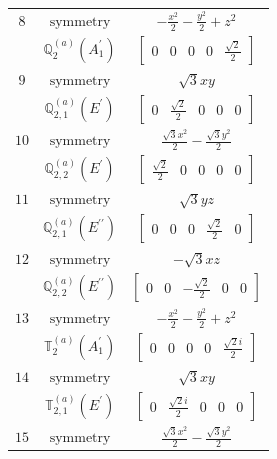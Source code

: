 \documentclass[fleqn,8pt,landscape]{jsarticle}
\begin{document}
\begin{longtable}{ccc}
$ 8 $ & $ \text{symmetry} $ & $ - \frac{x^{2}}{2} - \frac{y^{2}}{2} + z^{2} $ \\
$  $ & $ \mathbb{Q}_{2}^{(a)}(A_{1}^{\prime}) $ & $ \begin{bmatrix} 0 & 0 & 0 & 0 & \frac{\sqrt{2}}{2} \end{bmatrix} $ \\ \hline
$ 9 $ & $ \text{symmetry} $ & $ \sqrt{3} x y $ \\
$  $ & $ \mathbb{Q}_{2,1}^{(a)}(E^{\prime}) $ & $ \begin{bmatrix} 0 & \frac{\sqrt{2}}{2} & 0 & 0 & 0 \end{bmatrix} $ \\ \hline
$ 10 $ & $ \text{symmetry} $ & $ \frac{\sqrt{3} x^{2}}{2} - \frac{\sqrt{3} y^{2}}{2} $ \\
$  $ & $ \mathbb{Q}_{2,2}^{(a)}(E^{\prime}) $ & $ \begin{bmatrix} \frac{\sqrt{2}}{2} & 0 & 0 & 0 & 0 \end{bmatrix} $ \\ \hline
$ 11 $ & $ \text{symmetry} $ & $ \sqrt{3} y z $ \\
$  $ & $ \mathbb{Q}_{2,1}^{(a)}(E^{\prime\prime}) $ & $ \begin{bmatrix} 0 & 0 & 0 & \frac{\sqrt{2}}{2} & 0 \end{bmatrix} $ \\ \hline
$ 12 $ & $ \text{symmetry} $ & $ - \sqrt{3} x z $ \\
$  $ & $ \mathbb{Q}_{2,2}^{(a)}(E^{\prime\prime}) $ & $ \begin{bmatrix} 0 & 0 & - \frac{\sqrt{2}}{2} & 0 & 0 \end{bmatrix} $ \\ \hline
$ 13 $ & $ \text{symmetry} $ & $ - \frac{x^{2}}{2} - \frac{y^{2}}{2} + z^{2} $ \\
$  $ & $ \mathbb{T}_{2}^{(a)}(A_{1}^{\prime}) $ & $ \begin{bmatrix} 0 & 0 & 0 & 0 & \frac{\sqrt{2} i}{2} \end{bmatrix} $ \\ \hline
$ 14 $ & $ \text{symmetry} $ & $ \sqrt{3} x y $ \\
$  $ & $ \mathbb{T}_{2,1}^{(a)}(E^{\prime}) $ & $ \begin{bmatrix} 0 & \frac{\sqrt{2} i}{2} & 0 & 0 & 0 \end{bmatrix} $ \\ \hline
$ 15 $ & $ \text{symmetry} $ & $ \frac{\sqrt{3} x^{2}}{2} - \frac{\sqrt{3} y^{2}}{2} $ \\

\end{longtable}
\end{document}
